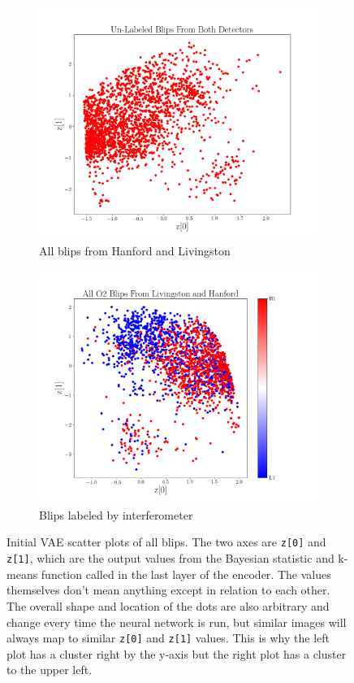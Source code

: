 \documentclass[a4paper]{article}
\begin{document}
\begin{figure}[h!]
	\centering
	\begin{subfigure}{.49\textwidth}
		\centering
		\includegraphics[width=1\linewidth]{vae_unlabeled}
		\caption{All blips from Hanford and Livingston}
		\label{fig:vae_unlabeled}
	\end{subfigure}
	\begin{subfigure}{.49\textwidth}
		\centering
		\includegraphics[width=1\linewidth]{vae_ifo_unlabeled}
		\caption{Blips labeled by interferometer}
		\label{fig:vae_ifo_unlabeled}
	\end{subfigure}
	\caption{Initial VAE scatter plots of all blips. The two axes are \texttt{z[0]} and \texttt{z[1]}, which are the output values from the Bayesian statistic and k-means function called in the last layer of the encoder. The values themselves don't mean anything except in relation to each other. The overall shape and location of the dots are also arbitrary and change every time the neural network is run, but similar images will always map to similar \texttt{z[0]} and \texttt{z[1]} values. This is why the left plot has a cluster right by the y-axis but the right plot has a cluster to the upper left.}
	\label{fig:unlabeled}
\end{figure}
\end{document}
